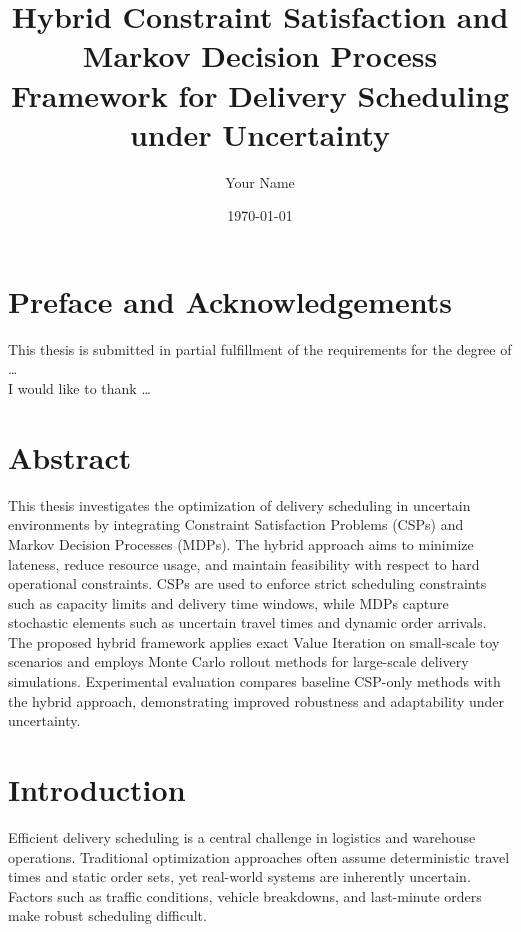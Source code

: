 \documentclass[a4paper,12pt]{report}
\begin{document}
\title{Hybrid Constraint Satisfaction and Markov Decision Process Framework for Delivery Scheduling under Uncertainty}
\author{Your Name}
\date{\today}
\maketitle

\chapter*{Preface and Acknowledgements}
This thesis is submitted in partial fulfillment of the requirements for the degree of \dots \\
I would like to thank \dots

\chapter*{Abstract}
This thesis investigates the optimization of delivery scheduling in uncertain environments 
by integrating Constraint Satisfaction Problems (CSPs) and Markov Decision Processes (MDPs). 
The hybrid approach aims to minimize lateness, reduce resource usage, and maintain feasibility 
with respect to hard operational constraints. CSPs are used to enforce strict scheduling 
constraints such as capacity limits and delivery time windows, while MDPs capture stochastic 
elements such as uncertain travel times and dynamic order arrivals. The proposed hybrid 
framework applies exact Value Iteration on small-scale toy scenarios and employs 
Monte Carlo rollout methods for large-scale delivery simulations. Experimental evaluation 
compares baseline CSP-only methods with the hybrid approach, demonstrating improved robustness 
and adaptability under uncertainty.

\tableofcontents

\chapter{Introduction}
Efficient delivery scheduling is a central challenge in logistics and warehouse operations. 
Traditional optimization approaches often assume deterministic travel times and static order sets, 
yet real-world systems are inherently uncertain. Factors such as traffic conditions, 
vehicle breakdowns, and last-minute orders make robust scheduling difficult. 
\end{document}
